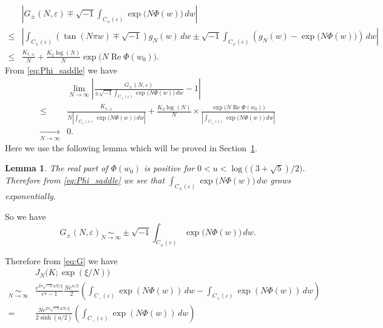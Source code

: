 \documentclass[a4paper]{amsart}
\theoremstyle{plain}
\newtheorem{lem}[thm]{Lemma}
\theoremstyle{definition}
\theoremstyle{remark}
\renewcommand{\Re}{\operatorname{Re}}
\numberwithin{equation}{section}
\begin{document}
\begin{equation*}
\begin{split}
  &\left|
    G_{\pm}(N,\varepsilon)
    \mp
    \sqrt{-1}
    \int_{C_{\pm}(\varepsilon)}\exp\bigl(N\Phi(w)\bigr)\,dw
  \right|
  \\
  \le&
  \left|
    \int_{C_{\pm}(\varepsilon)}(\tan(N\pi w)\mp\sqrt{-1})g_N(w)\,dw
    \pm\sqrt{-1}
    \int_{C_{\pm}(\varepsilon)}\left(g_N(w)-\exp\bigl(N\Phi(w)\bigr)\right)\,dw
  \right|
  \\
  \le&
  \frac{K_{1,\pm}}{N}
  +
  \frac{K_2\log(N)}{N}
  \exp\bigl(N\Re\Phi(w_0)\bigr).
\end{split}
\end{equation*}
From \eqref{eq:Phi_saddle} we have
\begin{equation*}
\begin{split}
  &\lim_{N\to\infty}
  \left|
    \frac{G_{\pm}(N,\varepsilon)}
         {\pm\sqrt{-1}
          \int_{C_{\pm}(\varepsilon)}\exp\bigl(N\Phi(w)\bigr)\,dw}
  -1
  \right|
  \\
  \le&
  \frac{K_{1,\pm}}
       {N
        \left|
          \int_{C_{\pm}(\varepsilon)}\exp\bigl(N\Phi(w)\bigr)\,dw
        \right|}
  +
  \frac{K_2\log(N)}{N}\times
  \frac{\exp\bigl(N\Re\Phi(w_0)\bigr)}
       {\left|
          \int_{C_{\pm}(\varepsilon)}\exp\bigl(N\Phi(w)\bigr)\,dw
        \right|}
  \\
  \underset{N\to\infty}{\longrightarrow}&0.
\end{split}
\end{equation*}
Here we use the following lemma which will be proved in Section~\ref{lem:Phi_0}.
\begin{lem}\label{lem:Phi_0}
The real part of $\Phi(w_0)$ is positive for $0<u<\log\bigl((3+\sqrt{5})/2\bigr)$.
Therefore from \eqref{eq:Phi_saddle} we see that $\int_{C_{\pm}(\varepsilon)}\exp\bigl(N\Phi(w)\bigr)\,dw$ grows exponentially.
\end{lem}
So we have
\begin{equation*}
  G_{\pm}(N,\varepsilon)
  \underset{N\to\infty}{\sim}
  \pm\sqrt{-1}
  \int_{C_{\pm}(\varepsilon)}\exp\bigl(N\Phi(w)\bigr)\,dw.
\end{equation*}
\par
Therefore from \eqref{eq:G} we have
\begin{equation*}
\begin{split}
  &J_N\bigl(K;\exp(\xi/N)\bigr)
  \\
  \underset{N\to\infty}{\sim}&
  \frac{e^{2\pi\sqrt{-1}u N/\xi}}{e^u-1}
  \frac{N e^{u/2}}{2}
  \left(
    \int_{C_{-}(\varepsilon)}\exp(N\Phi(w))\,dw
    -
    \int_{C_{+}(\varepsilon)}\exp(N\Phi(w))\,dw
  \right)
  \\
  =&
  \frac{N e^{2\pi\sqrt{-1}u N/\xi}}{2\sinh(u/2)}
  \left(
    \int_{C_{-}(\varepsilon)}\exp(N\Phi(w))\,dw
  \right)
\end{split}
\end{equation*}
\end{document}
